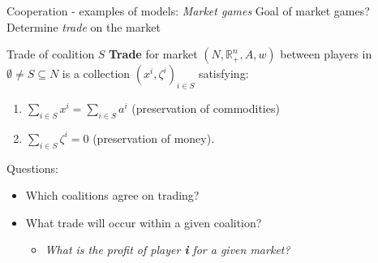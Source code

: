 \documentclass{beamer}
\begin{document}


\begin{frame}{Cooperation - examples of models: \textit{Market games}}
	Goal of market games? Determine \textit{trade} on the market
	\begin{block}{Trade of coalition $S$}
		\textbf{Trade} for market $(N,\mathbb{R}^n_+,A,w)$ between players in $\emptyset \neq S \subseteq N$ is a collection $(x^i,\zeta^i)_{i \in S}$ satisfying:
		\begin{enumerate}
                \pause
			\item $\sum_{i \in S}x^i = \sum_{i \in S}a^i$ (preservation of commodities)
                \pause
			\item $\sum_{i \in S}\zeta^i = 0$ (preservation of money).
		\end{enumerate}
	\end{block}
        \pause
	Questions:
        \pause
	\begin{itemize}
            \pause
		\item Which coalitions agree on trading?
		\pause
            \item What trade will occur within a given coalition? 
		\begin{itemize}
			\item \textit{What is the profit of player \textbf{i} for a given market?}
		\end{itemize}
	\end{itemize}
	
\end{frame}


\end{document}
